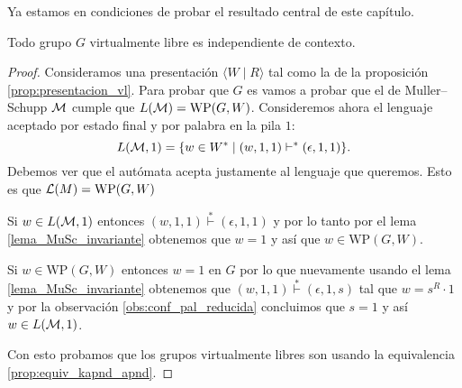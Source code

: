 \documentclass[tesis.tex]{subfiles}
\begin{document}
	
	
	Ya estamos en condiciones de probar el resultado central de este capítulo.

\begin{teo}\label{teo_Muller_Schupp}\cite{muller1983groups}
	Todo grupo $G$ virtualmente libre es independiente de contexto.
\end{teo}

\begin{proof}
	Consideramos una presentación $\langle W \mid R \rangle$ tal como la de la proposición \ref{prop:presentacion_vl}.
	Para probar que $G$ es \ic vamos a probar que el \APD de Muller--Schupp $\cal M$ cumple que $L({\cal M})= \text{WP}(G,W)$.
	Consideremos ahora el lenguaje aceptado por estado final y por palabra en la pila $1$:
	\[
	{L }({\cal M}, 1) = \{  w \in W^* \mid (w,1,1)   \vdash^*  (\epsilon, 1, 1)  \}.
	\]
	Debemos ver que el autómata acepta justamente al lenguaje que queremos. 
	Esto es que $ {\cal L }(M) = \text{WP}(G,W) $ 
	
	Si $w \in L({\cal M},1)$ entonces $(w, 1, 1) \overset{*}{\vdash} (\epsilon, 1, 1)$ y por lo tanto por el lema \ref{lema_MuSc_invariante} obtenemos que $w = 1$ y así que $w \in \text{WP}(G,W)$.
	
	Si $w \in \text{WP}(G,W)$ entonces $w = 1$ en $G$ por lo que nuevamente usando el lema \ref{lema_MuSc_invariante} obtenemos que $(w, 1, 1) \overset{*}{\vdash} (\epsilon, 1, s)$
	tal que $w = s^{R} \cdot 1$ y por la observación \ref{obs:conf_pal_reducida} concluimos que $s = 1$ y así $w \in L({\cal M},1)$.
	
	
	Con esto probamos que los grupos virtualmente libres son \ic usando la equivalencia \ref{prop:equiv_kapnd_apnd}.
	
\end{proof}



	
\end{document}
